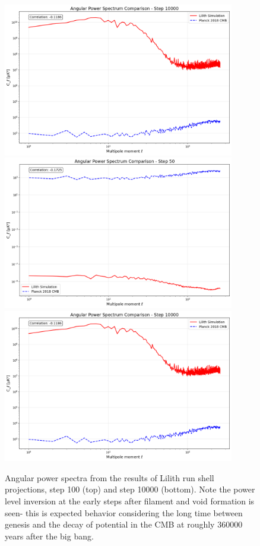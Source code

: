 \begin{figure}[ht]
  \includegraphics[width=0.9\textwidth]{images/power_spectrum1_010000.png}
  \includegraphics[width=0.9\textwidth]{images/power_spectrum1_000050.png}
  \includegraphics[width=0.9\textwidth]{images/power_spectrum1_010000.png}
  \caption{Angular power spectra from the results of Lilith run shell projections, step 100 (top) and step 10000 (bottom). Note the power level inversion at the early steps after filament and void formation is seen- this is expected behavior considering the long time between genesis and the decay of potential in the CMB at roughly 360000 years after the big bang.}
\end{figure}


